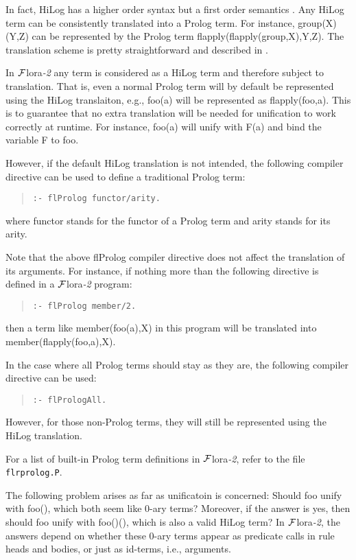\documentclass[11pt]{article}
\newcommand{\FLORA}{{\mbox{${\cal F}${\sc lora}\rm\emph{-2}}}\xspace}
\begin{document}
%
In fact, HiLog has a higher order syntax but a first order semantics
\cite{hilog-jlp}. Any HiLog term can be consistently translated into
a Prolog term. For instance, {\sf group(X)(Y,Z)} can be represented
by the Prolog term {\sf flapply(flapply(group,X),Y,Z)}. The translation
scheme is pretty straightforward and described in \cite{hilog-jlp}.

In \FLORA any term is considered as a HiLog term and therefore subject
to translation. That is, even a normal Prolog term will by default be
represented using the HiLog translaiton, e.g., {\sf foo(a)} will be
represented as {\sf flapply(foo,a)}. This is to guarantee that no
extra translation will be needed for unification to work correctly at
runtime. For instance, {\sf foo(a)} will unify with {\sf F(a)} and
bind the variable {\sf F} to {\sf foo}.

%
However, if the default HiLog translation is not intended, the following
compiler directive can be used to define a traditional Prolog term:
\begin{quote}
\verb|:- flProlog functor/arity.|
\end{quote}
where {\sf functor} stands for the functor of a Prolog term and
{\sf arity} stands for its arity.

Note that the above {\sf flProlog} compiler directive does not affect
the translation of its arguments. For instance, if nothing more than
the following directive is defined in a \FLORA program:
\begin{quote}
\verb|:- flProlog member/2.|
\end{quote}
then a term like {\sf member(foo(a),X)} in this program will be translated
into {\sf member(flapply(foo,a),X)}.

%
In the case where all Prolog terms should stay as they are, the following
compiler directive can be used:
\begin{quote}
\verb|:- flPrologAll.|
\end{quote}
However, for those non-Prolog terms, they will still be represented using
the HiLog translation.

For a list of built-in Prolog term definitions in \FLORA, refer to the
file {\tt flrprolog.P}.

%
The following problem arises as far as unificatoin is concerned:
Should {\sf foo} unify with {\sf foo()}, which both seem like 0-ary
terms? Moreover, if the answer is yes, then should {\sf foo} unify
with {\sf foo()()}, which is also a valid HiLog term?  In \FLORA, the
answers depend on whether these 0-ary terms appear as predicate calls
in rule heads and bodies, or just as id-terms, i.e., arguments.
\end{document}
